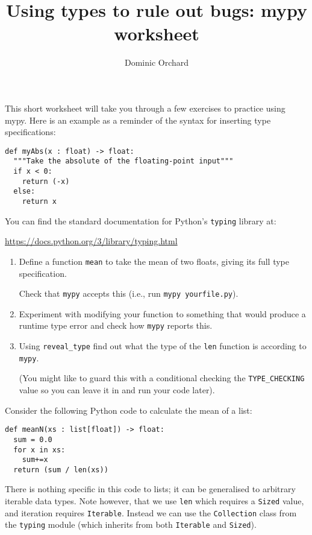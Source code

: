 \documentclass{article}
\title{Using types to rule out bugs: mypy worksheet}
\author{Dominic Orchard}
\date{}
\begin{document}
\maketitle

\noindent
This short worksheet will take you through a few exercises
to practice using mypy. Here is an example as a reminder
of the syntax for inserting type specifications:

\begin{verbatim}
def myAbs(x : float) -> float:
  """Take the absolute of the floating-point input"""
  if x < 0:
    return (-x)
  else:
    return x
\end{verbatim}
%
You can find the standard documentation for Python's
\texttt{typing} library at:

\begin{center}
  \url{https://docs.python.org/3/library/typing.html}
\end{center}

\begin{enumerate}
\item Define a function \texttt{mean} to take the mean of two
  floats, giving its full type specification.

  Check that \texttt{mypy} accepts this (i.e., run \texttt{mypy yourfile.py}).

\item Experiment with modifying your function to something that
 would produce a runtime type error and check how \texttt{mypy} reports this.

\item Using \texttt{reveal\_type} find out what the type of
  the \texttt{len} function is according to \texttt{mypy}.

  (You might like to guard this with a conditional checking the
  \texttt{TYPE\_CHECKING} value so you can leave it in and
  run your code later).
\end{enumerate}
%
Consider the following Python code to calculate
the mean of a list:
%
\begin{verbatim}
def meanN(xs : list[float]) -> float:
  sum = 0.0
  for x in xs:
    sum+=x
  return (sum / len(xs))
\end{verbatim}
%
There is nothing specific in this code to lists;
it can be generalised to arbitrary iterable data types.
Note however, that we use \texttt{len} which requires a
\texttt{Sized} value, and iteration requires \texttt{Iterable}.
Instead we can use the \texttt{Collection} class from the \texttt{typing} module
  (which inherits from both \texttt{Iterable} and \texttt{Sized}).
\end{document}
